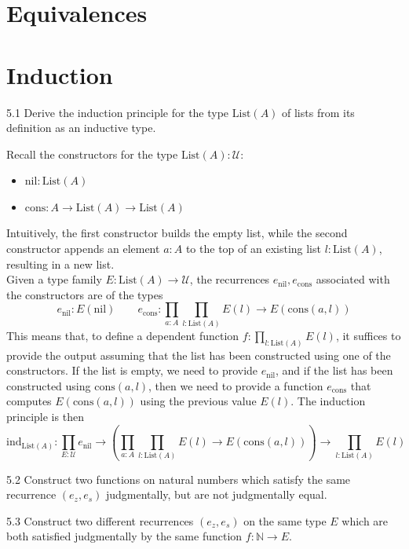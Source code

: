 \documentclass[14pt]{extarticle}
\newcommand{\N}{{\mathbb N}}
\newcommand{\0}{{\mathbf 0}}
\newcommand{\1}{{\mathbf 1}}
\newcommand{\2}{{\mathbf 2}}
\newcommand{\UU}{{\mathcal U}}
\newcommand{\ind}{\mathrm{ind}}
\newcommand{\cons}{\mathrm{cons}}
\newcommand{\List}{\mathrm{List}}
\newcommand{\nil}{\mathrm{nil}}
\begin{document}
\section*{Equivalences}
\section*{Induction}

\begin{prob}{5.1}{} Derive the induction principle for the type $\List(A)$ of lists from its definition as an inductive type.
\end{prob}
Recall the constructors for the type $\List(A) : \UU$:
\begin{itemize}
\item $\nil : \List(A)$
\item $\cons : A \to \List(A) \to \List(A)$
\end{itemize}
Intuitively, the first constructor builds the empty list, while the second constructor appends an element $a:A$ to the top of an existing list $l:\List(A)$, resulting in a new list.\\
Given a type family $E : \List(A) \to \UU$, the recurrences $e_\nil, e_\cons$ associated with the constructors are of the types
\[e_\nil : E(\nil) \qquad e_\cons : \prod_{a:A} \prod_{l:\List(A)}E(l) \to E(\cons(a,l))\]
This means that, to define a dependent function $f : \prod_{l:\List(A)}E(l)$, it suffices to provide the output assuming that the list has been constructed using one of the constructors. If the list is empty, we need to provide $e_\nil$, and if the list has been constructed using $\cons(a,l)$, then we need to provide a function $e_\cons$ that computes $E(\cons(a,l))$ using the previous value $E(l)$. The induction principle is then
\[\ind_{\List(A)} : \prod_{E:\UU}e_\nil \to \left( \prod_{a:A} \prod_{l:\List(A)}E(l) \to E(\cons(a,l))\right) \to \prod_{l:\List(A)}E(l)\]

\begin{prob}{5.2}{} Construct two functions on natural numbers which satisfy the same recurrence $(e_z,e_s)$ judgmentally, but are not judgmentally equal.
\end{prob}


\begin{prob}{5.3}{} Construct two different recurrences $(e_z,e_s)$ on the same type $E$ which are both satisfied judgmentally by the same function $f : \N \to E$.
\end{prob}
\end{document}
